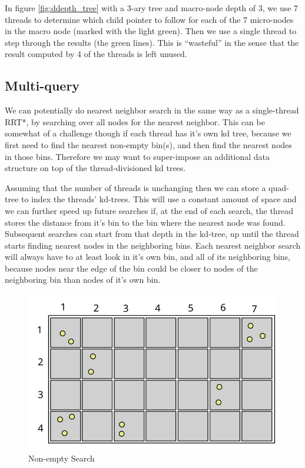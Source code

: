 In figure \ref{fig:ddepth_tree} with a 3-ary tree and macro-node depth of 3, we use 7 threads to determine which child pointer to follow for each of the 7 micro-nodes in the macro node (marked with the light green). Then we use a single thread to step through the results (the green lines). This is ``wasteful'' in the sense that the result computed by 4 of the threads is left unused. 

\subsection{Multi-query}
We can potentially do nearest neighbor search in the same way as a single-thread RRT*, by searching over all nodes for the nearest neighbor. This can be somewhat of a challenge though if each thread has it's own kd tree, because we first need to find the nearest non-empty bin(s), and then find the nearest nodes in those bins. Therefore we may want to super-impose an additional data structure on top of the thread-divisioned kd trees.  

Assuming that the number of threads is unchanging then we can store a quad-tree to index the threads' kd-trees. This will use a constant amount of space and we can further speed up future searches if, at the end of each search, the thread stores the distance from it's bin to the bin where the nearest node was found. Subsequent searches can start from that depth in the kd-tree, up until the thread starts finding nearest nodes in the neighboring bins. Each nearest neighbor search will always have to at least look in it's own bin, and all of its neighboring bins, because nodes near the edge of the bin could be closer to nodes of the neighboring bin than nodes of it's own bin.

\begin{figure}[H]
\begin{centering}
    \includegraphics[scale=1]{fig/nonempty_search}
    \caption{Non-empty Search}
    \label{fig:nonempty}
\end{centering}
\end{figure}


